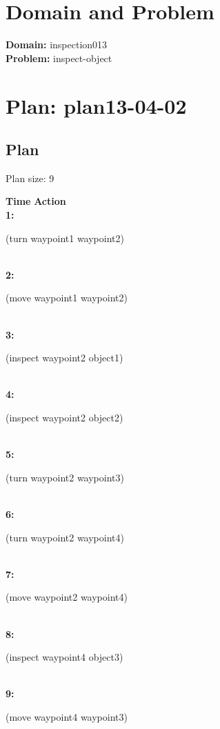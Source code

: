 \documentclass[a4paper,12pt]{article}
\author{\mbox{\sc {\sc Val}}}
\newcommand{\headingtimeaction}{{\bf Time} \qquad \= {\bf Action}\\[0.8ex]}
\newcommand{\atime}[1]{{\bf #1:}}
\newcommand{\action}[1]{{\sf #1}}
\newcommand{\listrow}[1]{\begin{minipage}[t]{11.5cm} #1 \end{minipage}}
\begin{document}
 \maketitle 
\section{Domain and Problem}
{\bf Domain:} inspection013\\
{\bf Problem:} inspect-object
\section{\sloppy Plan: plan13-04-02}
\subsection{Plan}
Plan size: 9
\begin{tabbing}
\headingtimeaction 
\atime{1} \> \listrow{\action{(turn waypoint1 waypoint2)}}\\
\atime{2} \> \listrow{\action{(move waypoint1 waypoint2)}}\\
\atime{3} \> \listrow{\action{(inspect waypoint2 object1)}}\\
\atime{4} \> \listrow{\action{(inspect waypoint2 object2)}}\\
\atime{5} \> \listrow{\action{(turn waypoint2 waypoint3)}}\\
\atime{6} \> \listrow{\action{(turn waypoint2 waypoint4)}}\\
\atime{7} \> \listrow{\action{(move waypoint2 waypoint4)}}\\
\atime{8} \> \listrow{\action{(inspect waypoint4 object3)}}\\
\atime{9} \> \listrow{\action{(move waypoint4 waypoint3)}}\\
\end{tabbing}
\end{document}

